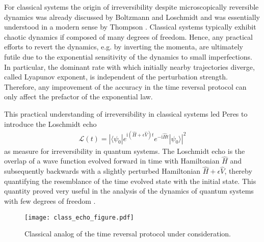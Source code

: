 \documentclass[%
 reprint,
unsortedaddress,
 amsmath,amssymb,
 prl,
]{revtex4-1}
\newcommand{\im}{\mathrm{i}}
\begin{document}
For classical systems the origin of irreversibility despite microscopically reversible dynamics 
 was already discussed by Boltzmann and Loschmidt
\cite{Boltzmann1872,Loschmidt1876,Boltzmann1877} and was 
essentially understood in a modern sense by Thompson \cite{Thompson1874}.
Classical systems typically exhibit chaotic dynamics if composed of many degrees of freedom.
Hence, any practical efforts to revert the dynamics, e.g. by inverting the momenta, 
are ultimately futile due to the exponential sensitivity of the dynamics to small imperfections.
In particular, the dominant rate with which initially nearby trajectories diverge, called Lyapunov exponent,
is independent of the perturbation strength. Therefore, any improvement of the accuracy in the time
reversal protocol can only affect the prefactor of the exponential law.

This practical understanding of irreversibility in classical systems 
led Peres \cite{Peres1984} to introduce the Loschmidt echo
\begin{align}
	\mathcal L(t)=|\langle\psi_0|e^{\im (\hat H+\epsilon\hat V)t}e^{-\im\hat Ht}|\psi_0\rangle|^2
\end{align}
as measure for irreversibility in quantum systems. The Loschmidt echo is the overlap
of a wave function evolved forward in time with Hamiltonian $\hat H$ and subsequently backwards
with a slightly perturbed Hamiltonian $\hat H+\epsilon\hat V$, thereby quantifying the resemblance of the
time evolved state with the initial state. This quantity proved very useful in the analysis of the
dynamics of quantum systems with few degrees of freedom \cite{Gorin2006,Jacquod2009}.

\begin{figure}[t]
\texttt{[image: class\_echo\_figure.pdf]}
\caption{Classical analog of the time reversal protocol under consideration.}
\label{fig:class_traj}
\end{figure}
\end{document}
